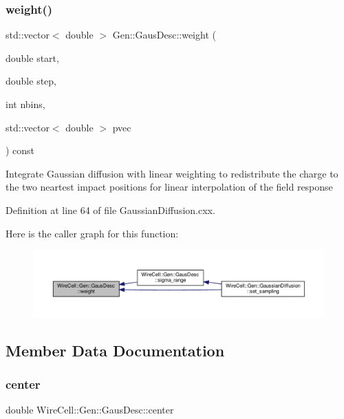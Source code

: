 \subsubsection{\texorpdfstring{weight()}{weight()}}
{\footnotesize\ttfamily std\+::vector$<$ double $>$ Gen\+::\+Gaus\+Desc\+::weight (\begin{DoxyParamCaption}\item[{double}]{start,  }\item[{double}]{step,  }\item[{int}]{nbins,  }\item[{std\+::vector$<$ double $>$}]{pvec }\end{DoxyParamCaption}) const}

Integrate Gaussian diffusion with linear weighting to redistribute the charge to the two neartest impact positions for linear interpolation of the field response 

Definition at line 64 of file Gaussian\+Diffusion.\+cxx.

Here is the caller graph for this function\+:
\nopagebreak
\begin{figure}[H]
\begin{center}
\leavevmode
\includegraphics[width=350pt]{struct_wire_cell_1_1_gen_1_1_gaus_desc_aa7099866e931d552fead98c5fcfcefb8_icgraph}
\end{center}
\end{figure}


\subsection{Member Data Documentation}
\mbox{\label{struct_wire_cell_1_1_gen_1_1_gaus_desc_aee8eb7e424437c7bab67828f4bf78c77}} 
\subsubsection{\texorpdfstring{center}{center}}
{\footnotesize\ttfamily double Wire\+Cell\+::\+Gen\+::\+Gaus\+Desc\+::center}

